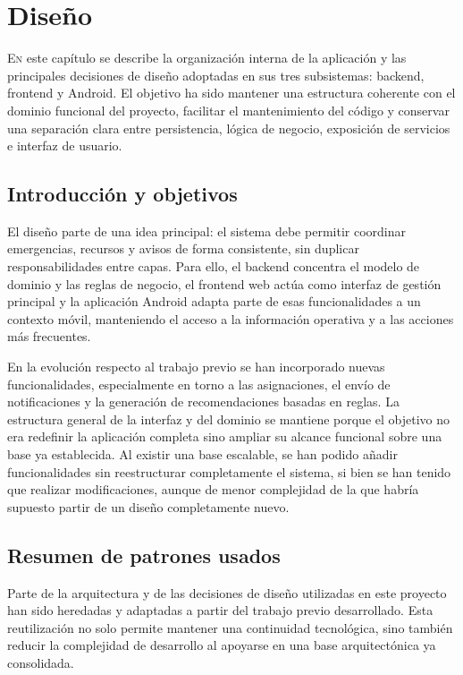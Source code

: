 \chapter{Diseño}
\label{chap:deseño}

\lettrine{E}{n} este capítulo se describe la organización interna de la aplicación y las principales decisiones de diseño adoptadas en sus tres subsistemas: backend, frontend y Android. El objetivo ha sido mantener una estructura coherente con el dominio funcional del proyecto, facilitar el mantenimiento del código y conservar una separación clara entre persistencia, lógica de negocio, exposición de servicios e interfaz de usuario.

\section{Introducción y objetivos}

El diseño parte de una idea principal: el sistema debe permitir coordinar emergencias, recursos y avisos de forma consistente, sin duplicar responsabilidades entre capas. Para ello, el backend concentra el modelo de dominio y las reglas de negocio, el frontend web actúa como interfaz de gestión principal y la aplicación Android adapta parte de esas funcionalidades a un contexto móvil, manteniendo el acceso a la información operativa y a las acciones más frecuentes.

En la evolución respecto al trabajo previo \cite{TFGAdrianGarcia2025} se han incorporado nuevas funcionalidades, especialmente en torno a las asignaciones, el envío de notificaciones y la generación de recomendaciones basadas en reglas. La estructura general de la interfaz y del dominio se mantiene porque el objetivo no era redefinir la aplicación completa sino ampliar su alcance funcional sobre una base ya establecida. Al existir una base escalable, se han podido añadir funcionalidades sin reestructurar completamente el sistema, si bien se han tenido que realizar modificaciones, aunque de menor complejidad de la que habría supuesto partir de un diseño completamente nuevo. 

\section{Resumen de patrones usados}
\label{sec:patrones}
Parte de la arquitectura y de las decisiones de diseño utilizadas en este proyecto han sido heredadas y adaptadas a partir del trabajo previo desarrollado. Esta reutilización no solo permite mantener una continuidad tecnológica, sino también reducir la complejidad de desarrollo al apoyarse en una base arquitectónica ya consolidada.

